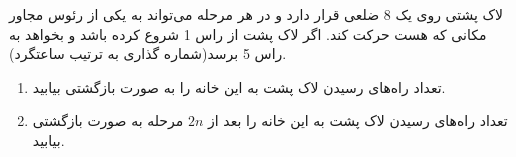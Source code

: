 \p
     لاک پشتی روی یک 8 ضلعی قرار دارد و در هر مرحله می‌تواند به یکی از رئوس مجاور مکانی که هست حرکت کند. اگر لاک پشت از راس 1 شروع کرده باشد و بخواهد به راس 5 برسد(شماره گذاری به ترتیب ساعتگرد).
	\begin{enumerate}
		\item
      تعداد راه‌های رسیدن لاک پشت به این خانه را به صورت بازگشتی بیابید.

    \item
      تعداد راه‌های رسیدن لاک پشت به این خانه را بعد از
       $2n$ 
       مرحله به صورت بازگشتی بیابید.
	\end{enumerate}